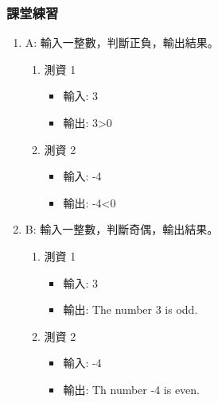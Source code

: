\documentclass[12pt,a4paper]{article}
\begin{document}
\subsubsection{課堂練習}
\label{sec:org1991e74}
\begin{enumerate}
\item A: 輸入一整數，判斷正負，輸出結果。
\label{sec:orgbdc59c0}
\begin{enumerate}
\item 測資 1
\label{sec:org42e6e4a}
\begin{itemize}
\item 輸入: 3
\item 輸出: 3>0
\end{itemize}
\item 測資 2
\label{sec:org84cbf87}
\begin{itemize}
\item 輸入: -4
\item 輸出: -4<0
\end{itemize}
\end{enumerate}
\item B: 輸入一整數，判斷奇偶，輸出結果。
\label{sec:orgd2cadd7}
\begin{enumerate}
\item 測資 1
\label{sec:orgaeda786}
\begin{itemize}
\item 輸入: 3
\item 輸出: The number 3 is odd.
\end{itemize}
\item 測資 2
\label{sec:orgd920c03}
\begin{itemize}
\item 輸入: -4
\item 輸出: Th number -4 is even.
\end{itemize}
\end{enumerate}
\end{enumerate}
\end{document}
